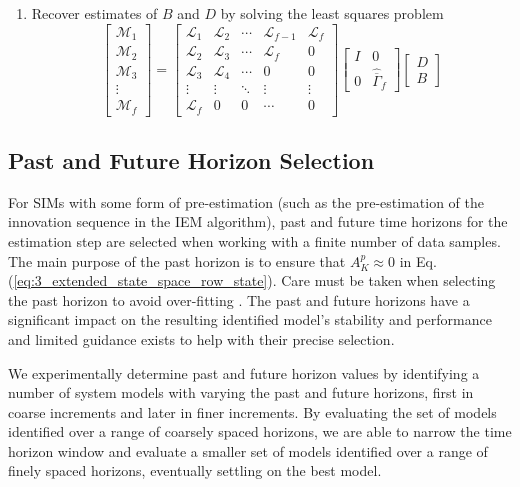 \begin{table}[!htb]
{\begin{minipage}{5.5in}
\begin{enumerate}
\item Recover estimates of $B$ and $D$ by solving the least squares problem
\begin{equation*}
\begin{bmatrix}\mathcal{M}_1\\ \mathcal{M}_2\\ \mathcal{M}_3\\ \vdots\\ \mathcal{M}_f\end{bmatrix} = 
\begin{bmatrix}
\mathcal{L}_1 & \mathcal{L}_2 & \cdots & \mathcal{L}_{f-1} & \mathcal{L}_f\\
\mathcal{L}_2 & \mathcal{L}_3 & \cdots & \mathcal{L}_{f} & 0\\
\mathcal{L}_3 & \mathcal{L}_4 & \cdots & 0 & 0\\
\vdots & \vdots & \ddots & \vdots & \vdots\\
\mathcal{L}_f & 0 & 0 & \cdots & 0
\end{bmatrix}
\begin{bmatrix}I & 0\\ 0 & \hat{\overline{\Gamma}}_f\end{bmatrix}
\begin{bmatrix}D \\ B\end{bmatrix}
\end{equation*}
\end{enumerate}
\end{minipage}}
\end{table}


\subsection{Past and Future Horizon Selection}\label{sec:past_and_future_horizon_selection}
For SIMs with some form of pre-estimation (such as the pre-estimation of the innovation sequence in the IEM algorithm), past and future time horizons for the estimation step are selected when working with a finite number of data samples. The main purpose of the past horizon is to ensure that $A_K^p \approx 0$ in Eq. (\ref{eq:3_extended_state_space_row_state}). Care must be taken when selecting the past horizon to avoid over-fitting \cite{van2013closed}. The past and future horizons have a significant impact on the resulting identified model's stability and performance and limited guidance exists to help with their precise selection.

We experimentally determine past and future horizon values by identifying a number of system models with varying the past and future horizons, first in coarse increments and later in finer increments. By evaluating the set of models identified over a range of coarsely spaced horizons, we are able to narrow the time horizon window and evaluate a smaller set of models identified  over a range of finely spaced horizons, eventually settling on the best model.


